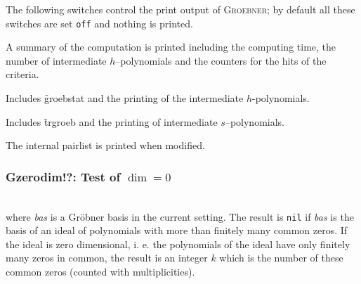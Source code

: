 The following switches control the print output of \textsc{Groebner}; by
default all these switches are set \texttt{off} and nothing is printed.
\begin{description}
\item[\f{groebstat} --]
\hypertarget{switch:GROEBSTAT}{}
  A summary of the computation is printed
including the computing time, the number of intermediate
$h$--polynomials and the counters for the hits of the criteria.

\item[\f{trgroeb} --]
  \hypertarget{switch:TRGROEB}{}
  Includes \f{groebstat} and the printing of the
intermediate $h$-poly\-nomials.

\item[\f{trgroebs} --]
    \hypertarget{switch:TRGROEBS}{}
Includes \f{trgroeb} and the printing of
intermediate $s$--poly\-nomials.

\item[\f{trgroeb1} --]
    \hypertarget{switch:TRGROEB1}{}
The internal pairlist is printed when modified.
\end{description}

\subsubsection{\f{\textbf{Gzerodim!?}}: Test of $\dim = 0$}
\begin{description}
\item[\f{gzerodim!?} \emph{bas}]\mbox{}\\
  \hypertarget{operator:GZERODIM!?}{}
where \textit{bas} is a Gr\"obner basis in the current setting.
The result is \texttt{nil} if \textit{bas} is the
basis of an ideal of polynomials with more than finitely many common zeros.
If the ideal is zero dimensional, i. e. the polynomials of the ideal have only
finitely many zeros in common, the result is an integer $k$ which is the number
of these common zeros (counted with multiplicities).
\end{description}


